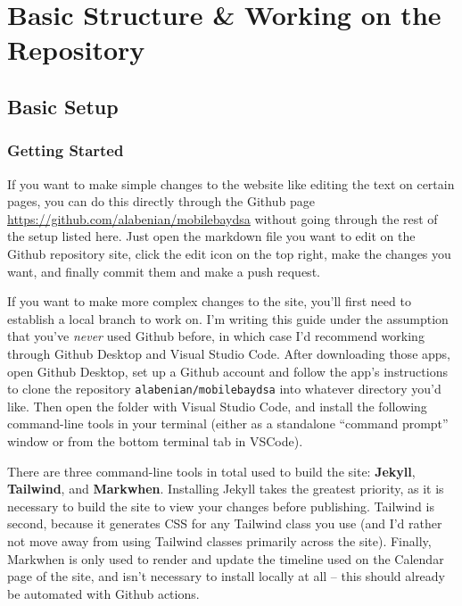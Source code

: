 \documentclass[
]{book}
\begin{document}
\part{Basic Structure \& Working on the Repository}\label{part-basic-structure-working-on-the-repository}

\chapter{Basic Setup}\label{basic-setup}

\section{Getting Started}\label{getting-started}

If you want to make simple changes to the website like editing the text on certain pages, you can do this directly through the Github page \url{https://github.com/alabenian/mobilebaydsa} without going through the rest of the setup listed here. Just open the markdown file you want to edit on the Github repository site, click the edit icon on the top right, make the changes you want, and finally commit them and make a push request.

If you want to make more complex changes to the site, you'll first need to establish a local branch to work on. I'm writing this guide under the assumption that you've \emph{never} used Github before, in which case I'd recommend working through Github Desktop and Visual Studio Code. After downloading those apps, open Github Desktop, set up a Github account and follow the app's instructions to clone the repository \texttt{alabenian/mobilebaydsa} into whatever directory you'd like. Then open the folder with Visual Studio Code, and install the following command-line tools in your terminal (either as a standalone ``command prompt'' window or from the bottom terminal tab in VSCode).

There are three command-line tools in total used to build the site: \textbf{Jekyll}, \textbf{Tailwind}, and \textbf{Markwhen}. Installing Jekyll takes the greatest priority, as it is necessary to build the site to view your changes before publishing. Tailwind is second, because it generates CSS for any Tailwind class you use (and I'd rather not move away from using Tailwind classes primarily across the site). Finally, Markwhen is only used to render and update the timeline used on the Calendar page of the site, and isn't necessary to install locally at all -- this should already be automated with Github actions.
\end{document}
